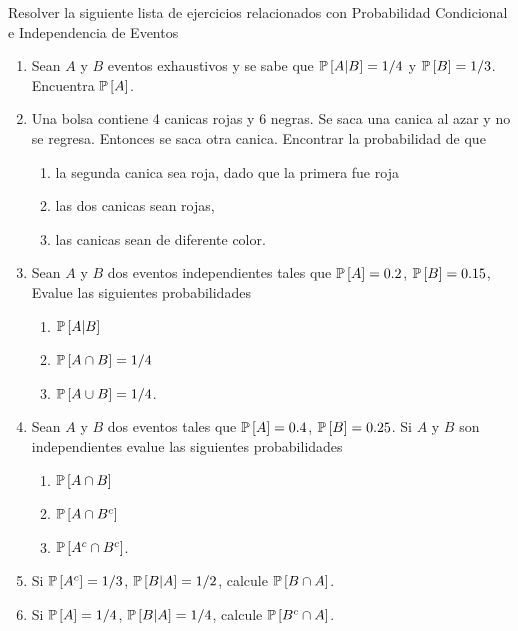 \begin{Ejer} Resolver la siguiente lista de ejercicios relacionados con Probabilidad Condicional e Independencia de Eventos
\begin{enumerate}

\item Sean $A$ y $B$ eventos exhaustivos y se sabe que $\mathbb{P}\left[A|B\right]=1/4$ y $\mathbb{P}\left[B\right]=1/3$. Encuentra $\mathbb{P}\left[A\right]$.

\item Una bolsa contiene 4 canicas rojas y 6 negras. Se saca una canica al azar y no se regresa. Entonces se saca otra canica. Encontrar la probabilidad de que
\begin{enumerate}
\item la segunda canica sea roja, dado que la primera fue roja
\item las dos canicas sean rojas,
\item las canicas sean de diferente color.
\end{enumerate}

\item Sean $A$ y $B$ dos eventos independientes tales que $\mathbb{P}\left[A\right]=0.2$, $\mathbb{P}\left[B\right]=0.15$, Evalue las siguientes probabilidades
\begin{enumerate}
\item $\mathbb{P}\left[A|B\right]$
\item $\mathbb{P}\left[A\cap B\right]=1/4$
\item $\mathbb{P}\left[A\cup B\right]=1/4$.
\end{enumerate}

\item Sean $A$ y $B$ dos eventos tales que $\mathbb{P}\left[A\right]=0.4$, $\mathbb{P}\left[B\right]=0.25$. Si $A$ y $B$ son independientes evalue las siguientes probabilidades
\begin{enumerate}
\item $\mathbb{P}\left[A\cap B\right]$
\item $\mathbb{P}\left[A\cap B^{c}\right]$
\item $\mathbb{P}\left[A^{c}\cap B^{c}\right]$.
\end{enumerate}
	
\item Si $\mathbb{P}\left[A^{c}\right]=1/3$, $\mathbb{P}\left[B|A\right]=1/2$, calcule $\mathbb{P}\left[B\cap A\right]$.

\item Si $\mathbb{P}\left[A\right]=1/4$, $\mathbb{P}\left[B|A\right]=1/4$, calcule $\mathbb{P}\left[B^{c}\cap A\right]$.


\end{enumerate}
\end{Ejer}
